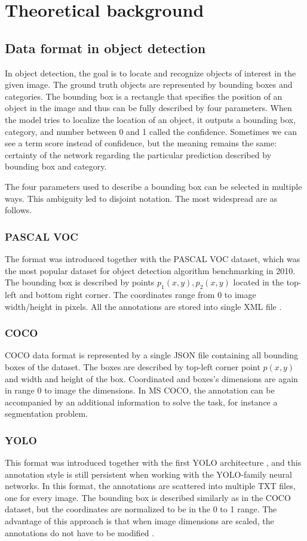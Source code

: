 \chapter{Theoretical background}
\section{Data format in object detection}
In object detection, the goal is to locate and recognize objects of interest in the given image. The ground truth objects are represented by bounding boxes and categories. The bounding box is a rectangle that specifies the position of an object in the image and thus can be fully described by four parameters. When the model tries to localize the location of an object, it outputs a bounding box, category, and number between 0 and 1 called the confidence. Sometimes we can see a term score instead of confidence, but the meaning remains the same: certainty of the network regarding the particular prediction described by bounding box and category.

The four parameters used to describe a bounding box can be selected in multiple ways. This ambiguity led to disjoint notation. The most widespread are as follows.
\subsection{PASCAL VOC}
The format was introduced together with the PASCAL VOC dataset, which was the most popular dataset for object detection algorithm benchmarking in 2010. The bounding box is described by points $p_1(x,y),p_2(x,y)$ located in the top-left and bottom right corner. The coordinates range from 0 to image width/height in pixels. All the annotations are stored into single XML file \cite{Everingham2009,Padilla2021}.
\subsection{COCO}
COCO data format is represented by a single JSON file containing all bounding boxes of the dataset. The boxes are described by top-left corner point $p(x,y)$ and width and height of the box. Coordinated and boxes's dimensions are again in range 0 to image the dimensions. In MS COCO, the annotation can be accompanied by an additional information to solve the task, for instance a segmentation problem.
\subsection{YOLO}
This format was introduced together with the first YOLO architecture \cite{Redmon2015}, and this annotation style is still persistent when working with the YOLO-family neural networks.
In this format, the annotations are scattered into multiple TXT files, one for every image.
The bounding box is described similarly as in the COCO dataset, but the coordinates are normalized to be in the 0 to 1 range. The advantage of this approach is that when image dimensions are scaled, the annotations do not have to be modified \cite{Redmon2015,Padilla2021}.


